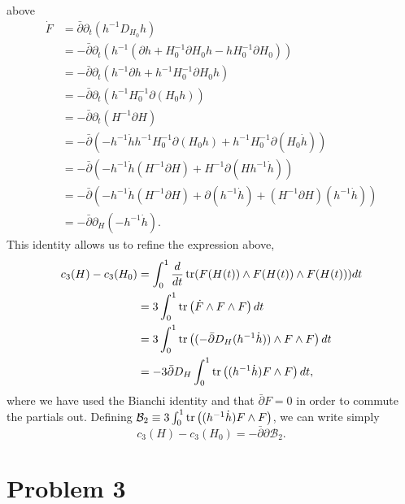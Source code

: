 \documentclass{../mathnotes}
\begin{document}
\begin{enumerate}[(a)]
        above
        \begin{align*}
            \dot F&=\bar\partial\partial_t(h^{-1}D_{H_0}h)\\
            &=-\bar\partial\partial_t\left( h^{-1}(\partial h+H_0^{-1}\partial H_0h-hH_0^{-1}\partial H_0) \right)\\
            &=-\bar\partial\partial_t\left( h^{-1}\partial h+h^{-1}H_0^{-1}\partial H_0h \right)\\
            &=-\bar\partial\partial_t\left( h^{-1}H_0^{-1}\partial(H_0h) \right)\\
            &=-\bar\partial\partial_t(H^{-1}\partial H) \\
            &=-\bar\partial\left( -h^{-1}\dot hh^{-1}H_0^{-1}\partial(H_0h)+h^{-1}H_0^{-1}\partial(H_0\dot h) \right)\\
            &=-\bar\partial\left( -h^{-1}\dot h(H^{-1}\partial H)+H^{-1}\partial(Hh^{-1}\dot h) \right)\\
            &=-\bar\partial\left( -h^{-1}\dot h(H^{-1}\partial H)+\partial(h^{-1}\dot h)+(H^{-1}\partial H)(h^{-1}\dot h) \right)\\
            &=-\bar\partial \partial_H(-h^{-1}\dot h).
        \end{align*}
        This identity allows us to refine the expression above,
        \begin{align*}
            c_3(H)-c_3(H_0) &= \int_0^1\frac{d}{dt}\operatorname{tr}(F(H(t))\wedge F(H(t))\wedge F(H(t)))dt\\
            &=3\int_0^1\operatorname{tr}\left( \dot F\wedge F\wedge F \right) dt\\
            &=3\int_0^1\operatorname{tr}\left( (-\bar\partial D_H(h^{-1}\dot h))\wedge F\wedge F \right)dt\\
            &=-3\bar\partial D_H\int_0^1\operatorname{tr}\left( (h^{-1}\dot h) F\wedge F \right)dt,
        \end{align*}
        where we have used the Bianchi identity and that $\bar\partial F=0$ in order to commute the partials out.
        Defining $\mathcal{B}_2\equiv3\int_0^1\operatorname{tr}\left( (h^{-1}\dot h)F\wedge F \right)$,
        we can write simply
        \[c_3(H)-c_3(H_0)=-\bar\partial\partial \mathcal{B}_2.\]
\end{enumerate}

\section*{Problem 3}
\end{document}
